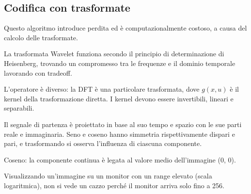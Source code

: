 \subsection{Codifica con trasformate}
Questo algoritmo introduce perdita ed è computazionalmente costoso, a causa del calcolo delle trasformate. 

La trasformata Wavelet funziona secondo il principio di determinazione di Heisenberg, trovando un compromesso tra le frequenze e il dominio temporale lavorando con tradeoff.

L'operatore è diverso: la DFT è una particolare trasformata, dove $g(x, u)$ è il kernel della trasformazione diretta. I kernel devono essere invertibili, lineari e separabili.

Il segnale di partenza è proiettato in base al suo tempo e spazio con le sue parti reale e immaginaria. Seno e coseno hanno simmetria rispettivamente dispari e pari, e trasformando si osserva l'influenza di ciascuna componente. 

Coseno: la componente continua è legata al valore medio dell'immagine (0, 0). 

Visualizzando un'immagine su un monitor con un range elevato (scala logaritmica), non si vede un cazzo perché il monitor arriva solo fino a 256.




